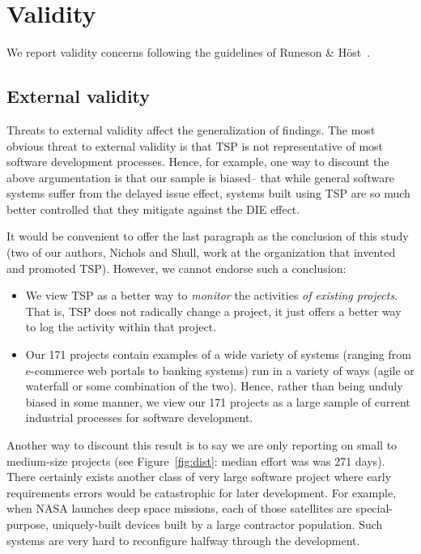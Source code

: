 \documentclass[smallcondesed]{svjour3}
\newcommand{\bi}{\begin{itemize}}%
\newcommand{\ei}{\end{itemize}}
\newcommand{\fig}[1]{Figure~\ref{fig:#1}}
\begin{document}
 


 
 

\section{Validity}
We report validity concerns following the guidelines of Runeson \& H\"{o}st~\cite{runeson09}.

\subsection{External validity}
Threats to external validity affect the generalization of findings. The most obvious threat to external validity is that TSP is not representative of most software development processes. Hence,
for example, 
one way to discount the above argumentation is that our sample is biased-- that while general software
systems suffer from the delayed issue effect, systems built using TSP are so much better controlled
that they  mitigate against the DIE effect.

It would be convenient to offer the last paragraph as the conclusion of this study
(two of our authors, Nichols and Shull,  work at the organization that invented and promoted TSP).
 However, we cannot endorse such a conclusion:
 \bi
 \item
We view TSP as a better way to
 {\em monitor} the activities {\em of  existing projects}. That is, TSP
 does not radically change a project, it just offers a better way to log the activity within
 that project. 
 \item
 Our 171 projects contain examples of a wide variety
 of systems (ranging from e-commerce web portals to  banking systems) run in a variety of
 ways (agile or  waterfall or some combination of the two). Hence, rather
 than being unduly  biased in some manner,
 we view our 171 projects as a large sample of current industrial processes for software
 development.
 \ei
Another way to discount this result is to say we are only reporting on small to medium-size
projects
(see
\fig{dist}:  median
effort was was  
271 days). 
There certainly exists another class of very large software project where early requirements
errors would be catastrophic for later development. For example, when NASA launches deep space missions,
each of those satellites are special-purpose, uniquely-built devices built by a large contractor
population. Such systems are very hard to reconfigure halfway through the development.  
\end{document}
